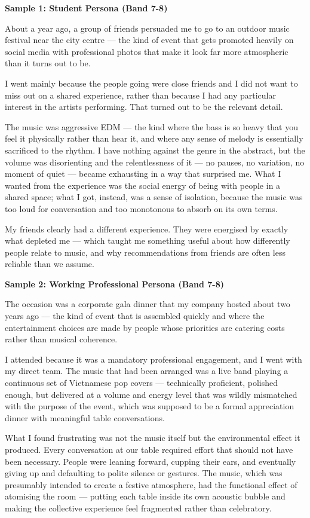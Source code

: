 \begin{ieltsanswer}
\textbf{Sample 1: Student Persona (Band 7-8)}

About a year ago, a group of friends persuaded me to go to an outdoor music festival near the city centre — the kind of event that gets promoted heavily on social media with professional photos that make it look far more atmospheric than it turns out to be.

I went mainly because the people going were close friends and I did not want to miss out on a shared experience, rather than because I had any particular interest in the artists performing. That turned out to be the relevant detail.

The music was aggressive EDM — the kind where the bass is so heavy that you feel it physically rather than hear it, and where any sense of melody is essentially sacrificed to the rhythm. I have nothing against the genre in the abstract, but the volume was disorienting and the relentlessness of it — no pauses, no variation, no moment of quiet — became exhausting in a way that surprised me. What I wanted from the experience was the social energy of being with people in a shared space; what I got, instead, was a sense of isolation, because the music was too loud for conversation and too monotonous to absorb on its own terms.

My friends clearly had a different experience. They were energised by exactly what depleted me — which taught me something useful about how differently people relate to music, and why recommendations from friends are often less reliable than we assume.

\textbf{Sample 2: Working Professional Persona (Band 7-8)}

The occasion was a corporate gala dinner that my company hosted about two years ago — the kind of event that is assembled quickly and where the entertainment choices are made by people whose priorities are catering costs rather than musical coherence.

I attended because it was a mandatory professional engagement, and I went with my direct team. The music that had been arranged was a live band playing a continuous set of Vietnamese pop covers — technically proficient, polished enough, but delivered at a volume and energy level that was wildly mismatched with the purpose of the event, which was supposed to be a formal appreciation dinner with meaningful table conversations.

What I found frustrating was not the music itself but the environmental effect it produced. Every conversation at our table required effort that should not have been necessary. People were leaning forward, cupping their ears, and eventually giving up and defaulting to polite silence or gestures. The music, which was presumably intended to create a festive atmosphere, had the functional effect of atomising the room — putting each table inside its own acoustic bubble and making the collective experience feel fragmented rather than celebratory.


\end{ieltsanswer}
